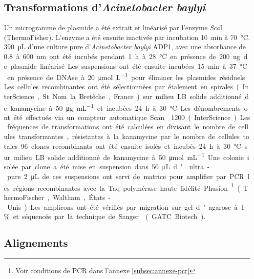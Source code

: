\subsection{Transformations d'\emph{Acinetobacter baylyi}}
\label{subsec:transfo}

Un microgramme de plasmide a été extrait et linéarisé par l'enzyme \emph{Sca}I
(ThermoFisher). L'enzyme a été ensuite inactivée par incubation \SI{10}{\minute}
à \SI{70}{\celsius}. \SI{390}{\uL} d'une culture pure d'\emph{Acinetobacter
  baylyi} ADP1, avec une absorbance de \SI{0,8} à \SI{600}{\nm} ont été incubés
pendant \SI{1}{\hour} à \SI{28}{\celsius} en présence de \SI{200}{\ng} de
plasmide linéarisé. Les suspensions ont été ensuite incubées \SI{15}{\minute} à
\SI{37}{\celsius} en présence de DNAse à \SI{20}{\umol\per\L} pour éliminer les
plasmides résiduels. Les cellules recombinantes ont été sélectionnées par
étalement en spirales (InterScience, St Nom la Bretêche, France) sur milieu LB
solide additionné de kanamycine à \SI{50}{\ug\per\mL} et incubées \SI{24}{\hour}
à \SI{30}{\celsius}. Les dénombrements ont été effectués via un compteur
automatique Scan\textsuperscript{\textregistered}1200 (InterScience). Les
fréquences de transformations ont été calculées en divisant le nombre de
cellules transformantes, résistantes à la kanamycine par le nombre de cellules
totales. 96 clones recombinants ont été ensuite isolés et incubés \SI{24}{\hour}
à \SI{30}{\celsius} sur milieu LB solide additionné de kanamycine à
\SI{50}{\umol\per\mL}. Une colonie isolée par clone a été mise en suspension
dans \SI{50}{\uL} d' ultra-pure. \SI{2}{\uL} de ces suspensions ont
servi de matrice pour amplifier par PCR les régions recombinantes avec la Taq
polymérase haute fidélité Phusion \footnote{Voir conditions de PCR dans l'annexe
  \ref{subsec:annexe-pcr}} (ThermoFischer, Waltham, États-Unis). Les amplicons
ont été vérifiés par migration sur gel d'agarose à 1\% et séquencés par la
technique de Sanger\cite{sanger_dna_1977} (GATC Biotech).

\subsection{Alignements}
\label{subsec:align}

